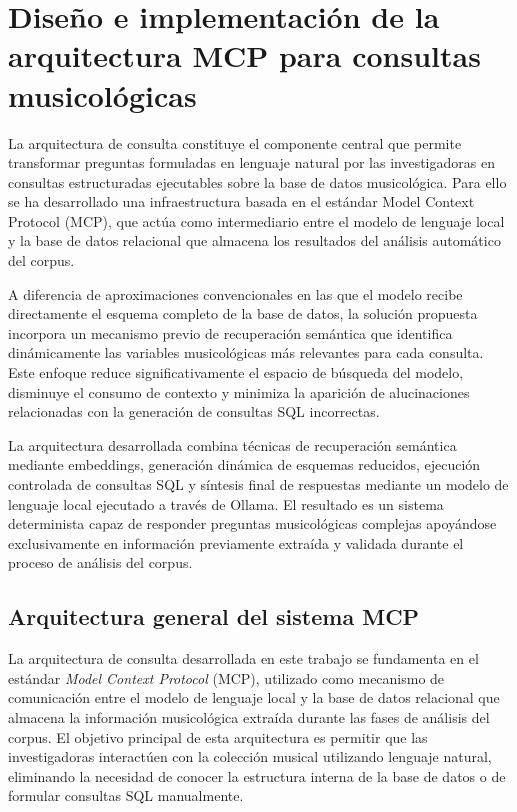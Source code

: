\section{Diseño e implementación de la arquitectura MCP para consultas musicológicas}
La arquitectura de consulta constituye el componente central que permite transformar preguntas formuladas en lenguaje natural por las investigadoras en consultas estructuradas ejecutables sobre la base de datos musicológica. Para ello se ha desarrollado una infraestructura basada en el estándar Model Context Protocol (MCP), que actúa como intermediario entre el modelo de lenguaje local y la base de datos relacional que almacena los resultados del análisis automático del corpus.

A diferencia de aproximaciones convencionales en las que el modelo recibe directamente el esquema completo de la base de datos, la solución propuesta incorpora un mecanismo previo de recuperación semántica que identifica dinámicamente las variables musicológicas más relevantes para cada consulta. Este enfoque reduce significativamente el espacio de búsqueda del modelo, disminuye el consumo de contexto y minimiza la aparición de alucinaciones relacionadas con la generación de consultas SQL incorrectas.

La arquitectura desarrollada combina técnicas de recuperación semántica mediante embeddings, generación dinámica de esquemas reducidos, ejecución controlada de consultas SQL y síntesis final de respuestas mediante un modelo de lenguaje local ejecutado a través de Ollama. El resultado es un sistema determinista capaz de responder preguntas musicológicas complejas apoyándose exclusivamente en información previamente extraída y validada durante el proceso de análisis del corpus.

\subsection{Arquitectura general del sistema MCP}
La arquitectura de consulta desarrollada en este trabajo se fundamenta en el estándar \textit{Model Context Protocol} (MCP), utilizado como mecanismo de comunicación entre el modelo de lenguaje local y la base de datos relacional que almacena la información musicológica extraída durante las fases de análisis del corpus. El objetivo principal de esta arquitectura es permitir que las investigadoras interactúen con la colección musical utilizando lenguaje natural, eliminando la necesidad de conocer la estructura interna de la base de datos o de formular consultas SQL manualmente.

